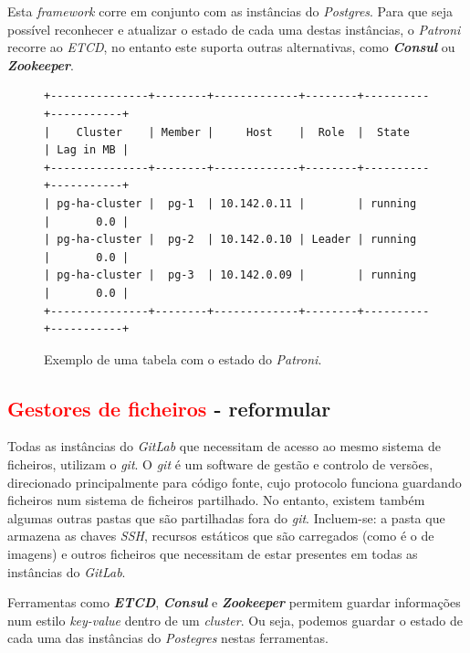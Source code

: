 \documentclass[12pt,a4paper]{article}
\begin{document}
Esta \emph{framework} corre em conjunto com as instâncias do \emph{Postgres}. Para que seja possível reconhecer e atualizar o estado de cada uma destas instâncias, o \emph{Patroni} recorre ao \emph{ETCD}, no entanto este suporta outras alternativas, como \textbf{\emph{Consul}} ou \textbf{\emph{Zookeeper}}.

\begin{figure}[H]
\begin{verbatim}
+---------------+--------+-------------+--------+----------+-----------+
|    Cluster    | Member |     Host    |  Role  |  State   | Lag in MB |
+---------------+--------+-------------+--------+----------+-----------+
| pg-ha-cluster |  pg-1  | 10.142.0.11 |        | running  |       0.0 |
| pg-ha-cluster |  pg-2  | 10.142.0.10 | Leader | running  |       0.0 |
| pg-ha-cluster |  pg-3  | 10.142.0.09 |        | running  |       0.0 |
+---------------+--------+-------------+--------+----------+-----------+
\end{verbatim}
\caption{Exemplo de uma tabela com o estado do \emph{Patroni}.}
\label{fig:c}
\end{figure}


\subsection{\textcolor{red}{Gestores de ficheiros} - reformular}

Todas as instâncias do \emph{GitLab} que necessitam de acesso ao mesmo sistema de ficheiros, utilizam o \emph{git}. O \emph{git} é um software de gestão e controlo de versões, direcionado principalmente para código fonte, cujo protocolo funciona guardando ficheiros num sistema de ficheiros partilhado. No entanto, existem também algumas outras pastas que são partilhadas fora do \emph{git}. Incluem-se: a pasta que armazena as chaves \emph{SSH}, recursos estáticos que são carregados (como é o de imagens) e outros ficheiros que necessitam de estar presentes em todas as instâncias do \emph{GitLab}.

\bigbreak
Ferramentas como \textbf{\emph{ETCD}}, \textbf{\emph{Consul}} e \textbf{\emph{Zookeeper}} permitem guardar informações num estilo \emph{key-value} dentro de um \emph{cluster}. Ou seja, podemos guardar o estado de cada uma das instâncias do \emph{Postegres} nestas ferramentas. 
\end{document}
